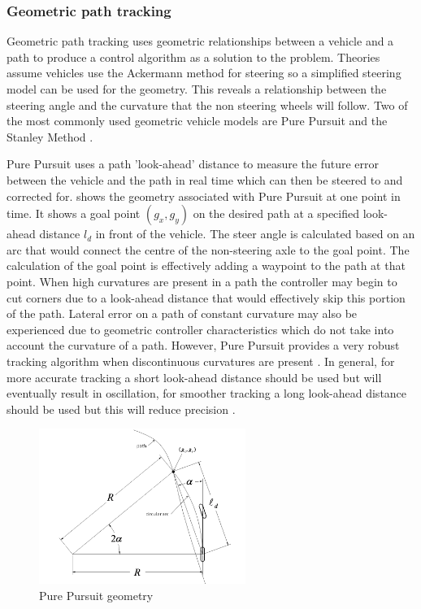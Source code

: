 \documentclass[main.tex]{subfiles}
\begin{document}
\subsubsection{Geometric path tracking}
Geometric path tracking uses geometric relationships between a vehicle and a path to produce a control algorithm as a solution to the problem. Theories assume vehicles use the Ackermann method for steering so a simplified steering model can be used for the geometry. This reveals a relationship between the steering angle and the curvature that the non steering wheels will follow. Two of the most commonly used geometric vehicle models are Pure Pursuit and the Stanley Method \parencite{snider2009}.

Pure Pursuit uses a path 'look-ahead' distance to measure the future error between the vehicle and the path in real time which can then be steered to and corrected for.  shows the geometry associated with Pure Pursuit at one point in time. It shows a goal point $(g_x, g_y)$ on the desired path at a specified look-ahead distance $l_d$ in front of the vehicle. The steer angle is calculated based on an arc that would connect the centre of the non-steering axle to the goal point. The calculation of the goal point is effectively adding a waypoint to the path at that point. When high curvatures are present in a path the controller may begin to cut corners due to a look-ahead distance that would effectively skip this portion of the path. Lateral error on a path of constant curvature may also be experienced due to geometric controller characteristics which do not take into account the curvature of a path. However, Pure Pursuit provides a very robust tracking algorithm when discontinuous curvatures are present \parencite{snider2009}. In general, for more accurate tracking a short look-ahead distance should be used but will eventually result in oscillation, for smoother tracking a long look-ahead distance should be used but this will reduce precision \parencite{snider2009}.
\begin{figure}[ht]
\includegraphics[width=0.6\textwidth]{2-LiteratureReview/purePursuitGoal.png}
\centering
\caption[Pure Pursuit geometry]{Pure Pursuit geometry \parencite{snider2009}} 
\end{figure}
\end{document}
